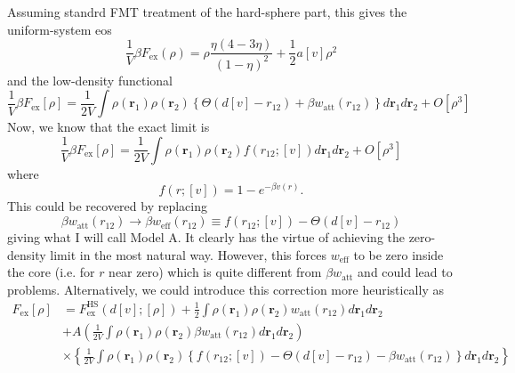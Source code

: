 \documentclass[aps,preprint]{revtex4-1}%
\begin{document}
Assuming standrd FMT treatment of the hard-sphere part, this gives the
uniform-system eos%
\begin{equation}
\frac{1}{V}\beta F_{\text{ex}}\left(  \rho\right)  =\rho\frac{\eta\left(
4-3\eta\right)  }{\left(  1-\eta\right)  ^{2}}+\frac{1}{2}a\left[  v\right]
\rho^{2}%
\end{equation}
and the low-density functional%
\begin{equation}
\frac{1}{V}\beta F_{\text{ex}}\left[  \rho\right]  =\frac{1}{2V}\int%
\rho\left(  \mathbf{r}_{1}\right)  \rho\left(  \mathbf{r}_{2}\right)  \left\{
\Theta\left(  d\left[  v\right]  -r_{12}\right)  +\beta w_{\text{att}}\left(
r_{12}\right)  \right\}  d\mathbf{r}_{1}d\mathbf{r}_{2}+O\left[  \rho
^{3}\right]
\end{equation}
Now, we know that the exact limit is
\begin{equation}
\frac{1}{V}\beta F_{\text{ex}}\left[  \rho\right]  =\frac{1}{2V}\int%
\rho\left(  \mathbf{r}_{1}\right)  \rho\left(  \mathbf{r}_{2}\right)  f\left(
r_{12};\left[  v\right]  \right)  d\mathbf{r}_{1}d\mathbf{r}_{2}+O\left[
\rho^{3}\right]
\end{equation}
where%
\begin{equation}
f\left(  r;\left[  v\right]  \right)  =1-e^{-\beta v\left(  r\right)  }.
\end{equation}
This could be recovered by replacing
\begin{equation}
\beta w_{\text{att}}\left(  r_{12}\right)  \rightarrow\beta w_{\text{eff}%
}\left(  r_{12}\right)  \equiv f\left(  r_{12};\left[  v\right]  \right)
-\Theta\left(  d\left[  v\right]  -r_{12}\right)
\end{equation}
giving what I will call Model A. It clearly has the virtue of achieving the
zero-density limit in the most natural way. However, this forces
$w_{\text{eff}}$ to be zero inside the core (i.e. for $r$ near zero) which is
quite different from  $\beta w_{\text{att}}$ and could lead to problems.
Alternatively, we could introduce this correction more heuristically as%
\begin{align}
F_{\text{ex}}\left[  \rho\right]    & =F_{\text{ex}}^{\text{HS}}\left(
d\left[  v\right]  ;\left[  \rho\right]  \right)  +\frac{1}{2}\int\rho\left(
\mathbf{r}_{1}\right)  \rho\left(  \mathbf{r}_{2}\right)  w_{\text{att}%
}\left(  r_{12}\right)  d\mathbf{r}_{1}d\mathbf{r}_{2}\\
& +A\left(  \frac{1}{2V}\int\rho\left(  \mathbf{r}_{1}\right)  \rho\left(
\mathbf{r}_{2}\right)  \beta w_{\text{att}}\left(  r_{12}\right)
d\mathbf{r}_{1}d\mathbf{r}_{2}\right)  \nonumber\\
& \times\left\{  \frac{1}{2V}\int\rho\left(  \mathbf{r}_{1}\right)
\rho\left(  \mathbf{r}_{2}\right)  \left\{  f\left(  r_{12};\left[  v\right]
\right)  -\Theta\left(  d\left[  v\right]  -r_{12}\right)  -\beta
w_{\text{att}}\left(  r_{12}\right)  \right\}  d\mathbf{r}_{1}d\mathbf{r}%
_{2}\right\}  \nonumber
\end{align}
\end{document}
